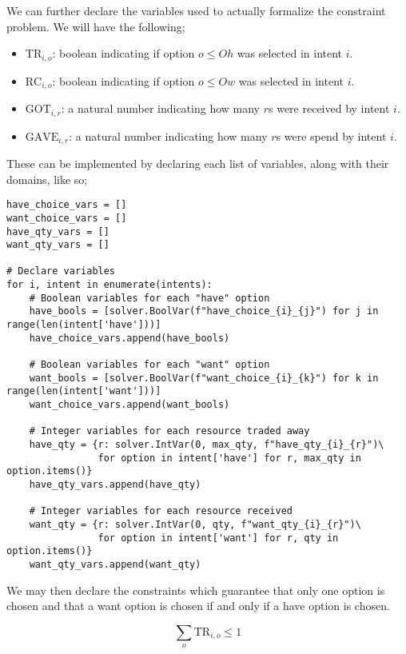 We can further declare the variables used to actually formalize the constraint problem. We will have the following;

\begin{itemize}
    \item $\text{TR}_{i, o}$:  boolean indicating if option $o \leq Oh$ was selected in intent $i$.
    \item $\text{RC}_{i, o}$:  boolean indicating if option $o \leq Ow$ was selected in intent $i$.
    \item $\text{GOT}_{i, r}$: a natural number indicating how many $r$s were received by intent $i$.
    \item $\text{GAVE}_{i, r}$: a natural number indicating how many $r$s were spend by intent $i$.
\end{itemize}

These can be implemented by declaring each list of variables, along with their domains, like so;

\begin{verbatim}
have_choice_vars = []
want_choice_vars = []
have_qty_vars = []
want_qty_vars = []

# Declare variables
for i, intent in enumerate(intents):
    # Boolean variables for each "have" option
    have_bools = [solver.BoolVar(f"have_choice_{i}_{j}") for j in range(len(intent['have']))]
    have_choice_vars.append(have_bools)
    
    # Boolean variables for each "want" option
    want_bools = [solver.BoolVar(f"want_choice_{i}_{k}") for k in range(len(intent['want']))]
    want_choice_vars.append(want_bools)
    
    # Integer variables for each resource traded away
    have_qty = {r: solver.IntVar(0, max_qty, f"have_qty_{i}_{r}")\
                for option in intent['have'] for r, max_qty in option.items()}
    have_qty_vars.append(have_qty)
    
    # Integer variables for each resource received
    want_qty = {r: solver.IntVar(0, qty, f"want_qty_{i}_{r}")\
                for option in intent['want'] for r, qty in option.items()}
    want_qty_vars.append(want_qty)
\end{verbatim}

We may then declare the constraints which guarantee that only one option is chosen and that a want option is chosen if and only if a have option is chosen.

\begin{equation}
    \sum_o \text{TR}_{i, o} \leq 1
\end{equation}

